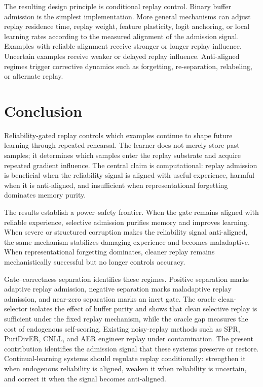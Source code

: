 \documentclass[preprint,12pt]{elsarticle}
\begin{document}
The resulting design principle is conditional replay control. Binary buffer admission is the simplest implementation. More general mechanisms can adjust replay residence time, replay weight, feature plasticity, logit anchoring, or local learning rates according to the measured alignment of the admission signal. Examples with reliable alignment receive stronger or longer replay influence. Uncertain examples receive weaker or delayed replay influence. Anti-aligned regimes trigger corrective dynamics such as forgetting, re-separation, relabeling, or alternate replay.

\section{Conclusion}

Reliability-gated replay controls which examples continue to shape future learning through repeated rehearsal. The learner does not merely store past samples; it determines which samples enter the replay substrate and acquire repeated gradient influence. The central claim is computational: replay admission is beneficial when the reliability signal is aligned with useful experience, harmful when it is anti-aligned, and insufficient when representational forgetting dominates memory purity.

The results establish a power--safety frontier. When the gate remains aligned with reliable experience, selective admission purifies memory and improves learning. When severe or structured corruption makes the reliability signal anti-aligned, the same mechanism stabilizes damaging experience and becomes maladaptive. When representational forgetting dominates, cleaner replay remains mechanistically successful but no longer controls accuracy.

Gate--correctness separation identifies these regimes. Positive separation marks adaptive replay admission, negative separation marks maladaptive replay admission, and near-zero separation marks an inert gate. The oracle clean-selector isolates the effect of buffer purity and shows that clean selective replay is sufficient under the fixed replay mechanism, while the oracle gap measures the cost of endogenous self-scoring. Existing noisy-replay methods such as SPR, PuriDivER, CNLL, and AER engineer replay under contamination. The present contribution identifies the admission signal that these systems preserve or restore. Continual-learning systems should regulate replay conditionally: strengthen it when endogenous reliability is aligned, weaken it when reliability is uncertain, and correct it when the signal becomes anti-aligned.
\end{document}
